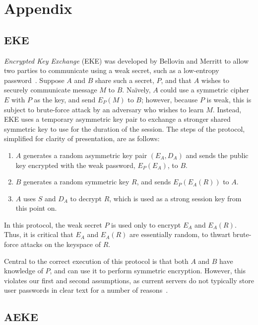 
\section*{Appendix}
\label{sec:appA}

\subsection*{EKE}

\emph{Encrypted Key Exchange} (EKE) was developed by Bellovin and
Merritt to allow two parties to communicate using a weak secret, such
as a low-entropy password~\cite{bellovin92}. Suppose $A$ and $B$ share
such a secret, $P$, and that $A$ wishes to securely communicate
message $M$ to $B$. Na\"ively, $A$ could use a symmetric cipher $E$
with $P$ as the key, and send $E_P(M)$ to $B$; however, because $P$ is
weak, this is subject to brute-force attack by an adversary who wishes
to learn $M$. Instead, EKE uses a temporary asymmetric key pair to
exchange a stronger shared symmetric key to use for the duration of
the session. The steps of the protocol, simplified for clarity of
presentation, are as follows:
\begin{enumerate}
\item $A$ generates a random asymmetric key pair $(E_A, D_A)$ and
  sends the public key encrypted with the weak password, $E_P(E_A)$,
  to $B$.
\item $B$ generates a random symmetric key $R$, and sends
  $E_P(E_A(R))$ to $A$.
\item $A$ uses $S$ and $D_A$ to decrypt $R$, which is used as a strong
  session key from this point on.
\end{enumerate}
In this protocol, the weak secret $P$ is used only to encrypt $E_A$
and $E_A(R)$. Thus, it is critical that $E_A$ and $E_A(R)$ are
essentially random, to thwart brute-force attacks on the keyspace of
$R$.

Central to the correct execution of this protocol is that both $A$ and
$B$ have knowledge of $P$, and can use it to perform symmetric
encryption. However, this violates our first and second assumptions,
as current servers do not typically store user passwords in clear text
for a number of reasons~\cite{lamport81}.

\subsection*{AEKE}

